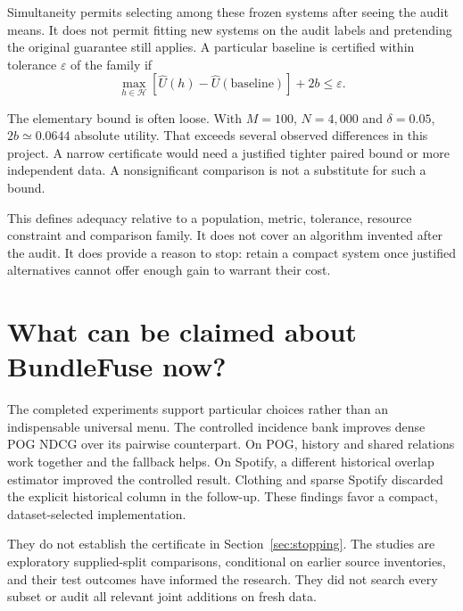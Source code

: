 \documentclass[11pt,a4paper]{article}
\begin{document}
Simultaneity permits selecting among these frozen systems after seeing the
audit means. It does not permit fitting new systems on the audit labels and
pretending the original guarantee still applies. A particular baseline is
certified within tolerance $\varepsilon$ of the family if
\begin{equation}
 \max_{h\in\mathcal H}
    [\widehat U(h)-\widehat U(\text{baseline})]+2b\leq\varepsilon.
\end{equation}

The elementary bound is often loose. With $M=100$, $N=4{,}000$ and
$\delta=0.05$, $2b\simeq0.0644$ absolute utility. That exceeds several
observed differences in this project. A narrow certificate would need a
justified tighter paired bound or more independent data. A nonsignificant
comparison is not a substitute for such a bound.

This defines adequacy relative to a population, metric, tolerance, resource
constraint and comparison family. It does not cover an algorithm invented
after the audit. It does provide a reason to stop: retain a compact system
once justified alternatives cannot offer enough gain to warrant their cost.

\section{What can be claimed about BundleFuse now?}
\label{sec:claims}

The completed experiments support particular choices rather than an
indispensable universal menu. The controlled incidence bank improves dense
POG NDCG over its pairwise counterpart. On POG, history and shared relations
work together and the fallback helps. On Spotify, a different historical
overlap estimator improved the controlled result. Clothing and sparse
Spotify discarded the explicit historical column in the follow-up.
These findings favor a compact, dataset-selected implementation.

They do not establish the certificate in Section~\ref{sec:stopping}.
The studies are exploratory supplied-split comparisons, conditional on
earlier source inventories, and their test outcomes have informed the
research. They did not search every subset or audit all relevant joint
additions on fresh data.
\end{document}
